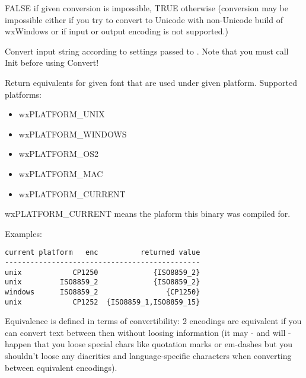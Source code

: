 
FALSE if given conversion is impossible, TRUE otherwise
(conversion may be impossible either if you try to convert
to Unicode with non-Unicode build of wxWindows or if input
or output encoding is not supported.)


\label{wxencodingconverterconvert}




Convert input string according to settings passed to .
Note that you must call Init before using Convert!



\label{wxencodingconvertergetplatformequivalents}


Return equivalents for given font that are used
under given platform. Supported platforms:

\begin{itemize}
\item wxPLATFORM\_UNIX
\item wxPLATFORM\_WINDOWS
\item wxPLATFORM\_OS2
\item wxPLATFORM\_MAC
\item wxPLATFORM\_CURRENT
\end{itemize}

wxPLATFORM\_CURRENT means the plaform this binary was compiled for.

Examples:
\begin{verbatim}
current platform   enc          returned value
----------------------------------------------
unix            CP1250             {ISO8859_2}
unix         ISO8859_2             {ISO8859_2}
windows      ISO8859_2                {CP1250}
unix            CP1252  {ISO8859_1,ISO8859_15}
\end{verbatim}

Equivalence is defined in terms of convertibility:
2 encodings are equivalent if you can convert text between
then without loosing information (it may - and will - happen
that you loose special chars like quotation marks or em-dashes
but you shouldn't loose any diacritics and language-specific
characters when converting between equivalent encodings).

